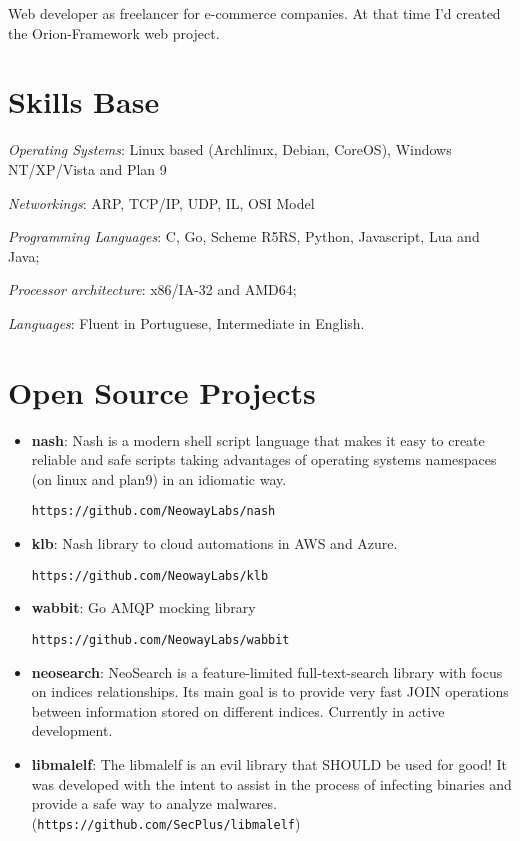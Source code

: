\documentclass[margin]{res}
\begin{document}
\begin{resume}
   Web developer as freelancer for e-commerce companies. At that time I'd created the Orion-Framework web project.



\section{Skills Base}  \textit{Operating Systems}:  Linux based (Archlinux, Debian, CoreOS), Windows NT/XP/Vista and Plan 9

			\textit{Networkings}: ARP, TCP/IP, UDP, IL, OSI Model

			\textit{Programming Languages}: C, Go, Scheme R5RS, Python, Javascript, Lua and Java;

			\textit{Processor architecture}:  x86/IA-32 and AMD64;

			\textit{Languages}: Fluent in Portuguese, Intermediate in English.

\section{Open Source Projects}
		\begin{itemize}
		    \vspace{2mm}
                    \item \textbf{nash}: Nash is a modern shell script
                      language that makes it easy to create reliable
                      and safe scripts taking advantages of operating
                      systems namespaces (on linux and plan9) in an
                      idiomatic way.

                      \texttt{https://github.com/NeowayLabs/nash}

                      \item \textbf{klb}: Nash library to cloud
                        automations in AWS and Azure.

                        \texttt{https://github.com/NeowayLabs/klb}

                        \item \textbf{wabbit}: Go AMQP mocking library

                          \texttt{https://github.com/NeowayLabs/wabbit}

		    \item \textbf{neosearch}: NeoSearch is a feature-limited full-text-search library with focus on indices relationships. Its main goal is to provide very fast JOIN operations between information stored on different indices. Currently in active development.  \vspace{1mm}
		    \item \textbf{libmalelf}: The libmalelf is an evil library that SHOULD be used for good! It was developed
		                              with the intent to assist in the process of infecting binaries and provide a safe
		                              way to analyze malwares. (\texttt{https://github.com/SecPlus/libmalelf})\vspace{1mm}


\end{itemize}
\end{resume}
\end{document}
